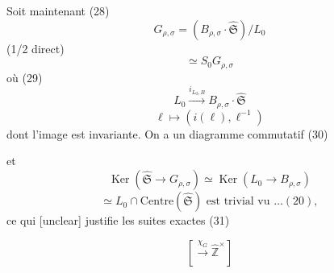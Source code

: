 \begin{enumerate}
Soit maintenant
(28)
$$ G_{\rho,\sigma} = (B_{\rho,\sigma} \cdot \widehat{\mathfrak{S}}) / L_0 $$
(1/2 direct)
$$ \simeq S_0 G_{\rho,\sigma} $$
où 
(29)
$$ L_0 \xrightarrow{i_{L_0, B}} B_{\rho,\sigma} \cdot \widehat{\mathfrak{S}} $$
$$ \ell \mapsto (i(\ell), \ell^{-1}) $$
dont l'image est invariante. On a un 
diagramme commutatif 
(30)
et 
$$ \operatorname{Ker}(\widehat{\mathfrak{S}} \to G_{\rho,\sigma}) \simeq \operatorname{Ker}(L_0 \to B_{\rho,\sigma}) $$
$$ \simeq L_0 \cap \text{Centre}(\widehat{\mathfrak{S}}) \text{ est trivial vu } \dots (20), $$
ce qui [unclear] justifie les 
suites exactes 
(31)
$$ [ \xrightarrow{\chi_G} \hat{\mathbb{Z}}^\times ] $$

\newpage



\newpage



\newpage



\newpage



\newpage



\newpage




\end{enumerate}
